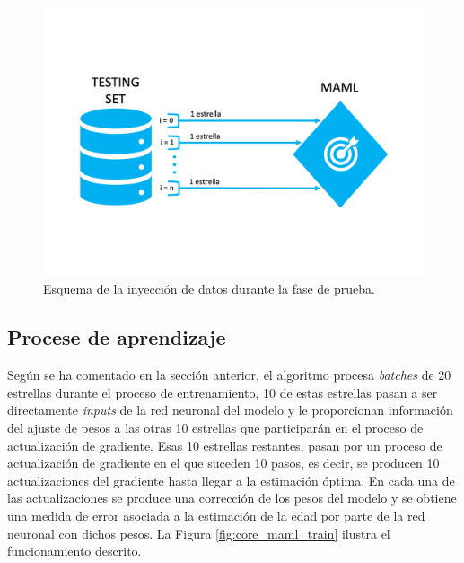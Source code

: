 \begin{figure}[H]
\begin{center}
 \includegraphics[width=0.8\linewidth]{Figuras/MAML/test_data.pdf}
\end{center}
\caption{Esquema de la inyección de datos durante la fase de prueba.}
 \label{fig:input_data_test}
\end{figure}


\subsection{Procese de aprendizaje} 

Según se ha comentado en la sección anterior, el algoritmo procesa \emph{batches} de 20 estrellas durante el proceso de entrenamiento, 10 de estas estrellas pasan a ser directamente \emph{inputs} de la red neuronal del modelo y le proporcionan información del ajuste de pesos a las otras 10 estrellas que participarán en el proceso de actualización de gradiente. Esas 10 estrellas restantes, pasan por un proceso de actualización de gradiente en el que suceden 10 pasos, es decir, se producen 10 actualizaciones del gradiente hasta llegar a la estimación óptima. En cada una de las actualizaciones se produce una corrección de los pesos del modelo y se obtiene una medida de error asociada a la estimación de la edad por parte de la red neuronal con dichos pesos. La Figura \ref{fig:core_maml_train} ilustra el funcionamiento descrito.

